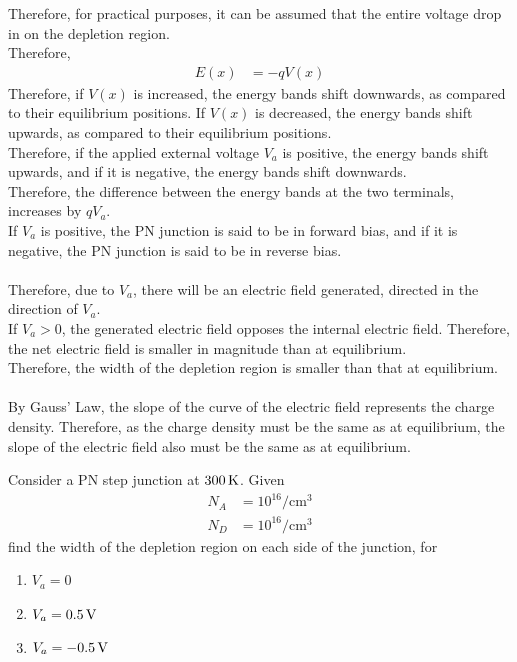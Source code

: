 \documentclass[titlepage, fleqn, a4paper, 12pt, twoside]{article}
\theoremstyle{definition}
\theoremstyle{theorem}
\begin{document}
Therefore, for practical purposes, it can be assumed that the entire voltage drop in on the depletion region.\\
Therefore,
\begin{align*}
	E(x) & = -q V(x)
\end{align*}
Therefore, if $V(x)$ is increased, the energy bands shift downwards, as compared to their equilibrium positions.
If $V(x)$ is decreased, the energy bands shift upwards, as compared to their equilibrium positions.\\
Therefore, if the applied external voltage $V_a$ is positive, the energy bands shift upwards, and if it is negative, the energy bands shift downwards.\\
Therefore, the difference between the energy bands at the two terminals, increases by $q V_a$.\\
If $V_a$ is positive, the PN junction is said to be in forward bias, and if it is negative, the PN junction is said to be in reverse bias.\\
~\\
Therefore, due to $V_a$, there will be an electric field generated, directed in the direction of $V_a$.\\
If $V_a > 0$, the generated electric field opposes the internal electric field.
Therefore, the net electric field is smaller in magnitude than at equilibrium.\\
Therefore, the width of the depletion region is smaller than that at equilibrium.\\
~\\
By Gauss' Law, the slope of the curve of the electric field represents the charge density.
Therefore, as the charge density must be the same as at equilibrium, the slope of the electric field also must be the same as at equilibrium.

\begin{question}
	Consider a PN step junction at $300 \kelvin$.
	Given
	\begin{align*}
		N_A & = 10^{16} \si{\per\centi\metre\cubed} \\
		N_D & = 10^{16} \si{\per\centi\metre\cubed}
	\end{align*}
	find the width of the depletion region on each side of the junction, for
	\begin{enumerate}
		\item $V_a = 0$
		\item $V_a = 0.5 \volt$
		\item $V_a = -0.5 \volt$
	\end{enumerate}
\end{question}
\end{document}
